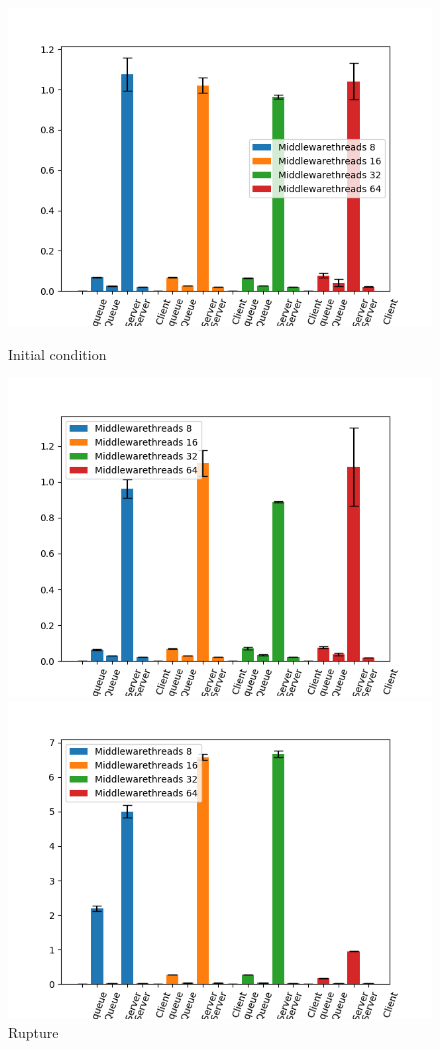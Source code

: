 \documentclass[11pt,a4paper]{article}
\begin{document}


\begin{figure}[H] 
  \label{ fig7} 
  \begin{minipage}[b]{0.5\linewidth}
    \centering
    \includegraphics[width=0.7\linewidth]{img/exp3_2/exp3_2_mw_percentile_plots_writes_0__vc_1.png} 
    \caption{Initial condition} 
    \vspace{4ex}
  \end{minipage}%
  \begin{minipage}[b]{0.5\linewidth}
    \centering
    \includegraphics[width=0.7\linewidth]{img/exp3_2/exp3_2_mw_percentile_plots_writes_1__vc_1.png} 
    \caption{Rupture} 
    \vspace{4ex}
  \end{minipage} 
  \begin{minipage}[b]{0.5\linewidth}
    \centering
    \includegraphics[width=0.7\linewidth]{img/exp3_2/exp3_2_mw_percentile_plots_writes_0__vc_4.png} 

\end{minipage}
\end{figure}
\end{document}

